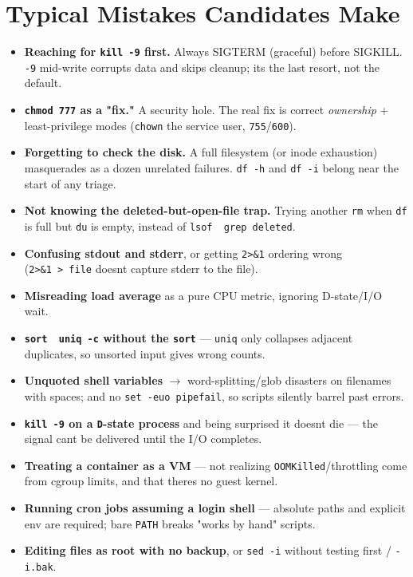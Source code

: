 \documentclass[11pt]{article}
\providecommand{\tightlist}{\setlength{\itemsep}{1pt}\setlength{\parskip}{0pt}}
\begin{document}
\section{Typical Mistakes Candidates Make}\label{typical-mistakes-candidates-make}

\begin{itemize}
\tightlist
\item
  \textbf{Reaching for \texttt{kill\ -9} first.} Always SIGTERM (graceful) before SIGKILL. \texttt{-9} mid-write corrupts data and skips cleanup; it\textquotesingle s the last resort, not the default.
\item
  \textbf{\texttt{chmod\ 777} as a "fix."} A security hole. The real fix is correct \emph{ownership} + least-privilege modes (\texttt{chown} the service user, \texttt{755}/\texttt{600}).
\item
  \textbf{Forgetting to check the disk.} A full filesystem (or inode exhaustion) masquerades as a dozen unrelated failures. \texttt{df\ -h} and \texttt{df\ -i} belong near the start of any triage.
\item
  \textbf{Not knowing the deleted-but-open-file trap.} Trying another \texttt{rm} when \texttt{df} is full but \texttt{du} is empty, instead of \texttt{lsof\ \textbar{}\ grep\ deleted}.
\item
  \textbf{Confusing stdout and stderr}, or getting \texttt{2\textgreater{}\&1} ordering wrong (\texttt{2\textgreater{}\&1\ \textgreater{}\ file} doesn\textquotesingle t capture stderr to the file).
\item
  \textbf{Misreading load average} as a pure CPU metric, ignoring D-state/I/O wait.
\item
  \textbf{\texttt{sort\ \textbar{}\ uniq\ -c} without the \texttt{sort}} --- \texttt{uniq} only collapses adjacent duplicates, so unsorted input gives wrong counts.
\item
  \textbf{Unquoted shell variables} \(\rightarrow\) word-splitting/glob disasters on filenames with spaces; and no \texttt{set\ -euo\ pipefail}, so scripts silently barrel past errors.
\item
  \textbf{\texttt{kill\ -9} on a \texttt{D}-state process} and being surprised it doesn\textquotesingle t die --- the signal can\textquotesingle t be delivered until the I/O completes.
\item
  \textbf{Treating a container as a VM} --- not realizing \texttt{OOMKilled}/throttling come from cgroup limits, and that there\textquotesingle s no guest kernel.
\item
  \textbf{Running cron jobs assuming a login shell} --- absolute paths and explicit env are required; bare \texttt{PATH} breaks "works by hand" scripts.
\item
  \textbf{Editing files as root with no backup}, or \texttt{sed\ -i} without testing first / \texttt{-i.bak}.
\end{itemize}
\end{document}
